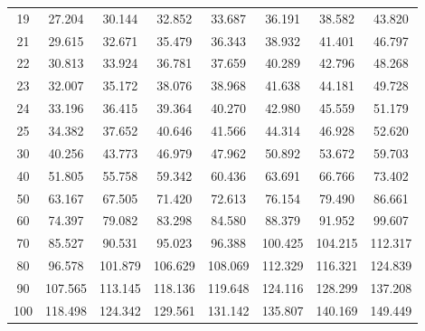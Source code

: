 \documentclass[12pt]{article}
\begin{document}
\begin{table}
\begin{center}
{\begin{tabular}{|c|c|c|c|c|c|c|c|}
	19 & 27.204 & 30.144 & 32.852 & 33.687 & 36.191 &38.582 & 43.820\\
	21 & 29.615  &32.671 & 35.479 & 36.343 & 38.932 & 41.401 & 46.797\\
	22 & 30.813&  33.924 & 36.781 & 37.659 & 40.289 & 42.796 & 48.268\\
	23 & 32.007 & 35.172 & 38.076 & 38.968 & 41.638 & 44.181 & 49.728\\
	24 & 33.196 & 36.415 & 39.364 & 40.270 & 42.980 & 45.559 & 51.179\\
	25 & 34.382 & 37.652 & 40.646 & 41.566 & 44.314 & 46.928 & 52.620\\
	30 & 40.256 & 43.773 & 46.979 & 47.962 & 50.892 & 53.672 & 59.703\\
	40 & 51.805 & 55.758 & 59.342 & 60.436 & 63.691 &66.766 & 73.402\\
	50 & 63.167 & 67.505 & 71.420 & 72.613 & 76.154 & 79.490 & 86.661\\
	60 & 74.397 & 79.082 & 83.298 & 84.580 & 88.379 & 91.952 & 99.607\\
	70 & 85.527 & 90.531 & 95.023 & 96.388 & 100.425& 104.215 &112.317\\
	80 & 96.578 & 101.879 & 106.629 &108.069 &112.329 &116.321 &124.839\\
	90 & 107.565 &113.145 &118.136& 119.648& 124.116& 128.299& 137.208\\
	100 & 118.498 &124.342 &129.561 &131.142 &135.807 &140.169 &149.449\\
	\hline
\end{tabular}
}
\end{center}
\end{table}

\end{document}

